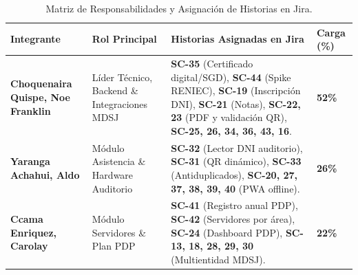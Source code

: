 \begin{table}[H]
\centering
\small
\caption{Matriz de Responsabilidades y Asignación de Historias en Jira.}
\label{tab:asignacion_responsables}
\begin{tabularx}{\textwidth}{P{4.0cm} P{3.0cm} Y P{1.8cm}}
\toprule
\textbf{Integrante} & \textbf{Rol Principal} & \textbf{Historias Asignadas en Jira} & \textbf{Carga (\%)} \\
\midrule
\textbf{Choquenaira Quispe, Noe Franklin} & Líder Técnico, Backend \& Integraciones MDSJ & 
\textbf{SC-35} (Certificado digital/SGD), \textbf{SC-44} (Spike RENIEC), \textbf{SC-19} (Inscripción DNI), \textbf{SC-21} (Notas), \textbf{SC-22, 23} (PDF y validación QR), \textbf{SC-25, 26, 34, 36, 43, 16}. & \textbf{52\%} \\
\addlinespace[0.1cm]
\textbf{Yaranga Achahui, Aldo} & Módulo Asistencia \& Hardware Auditorio & 
\textbf{SC-32} (Lector DNI auditorio), \textbf{SC-31} (QR dinámico), \textbf{SC-33} (Antiduplicados), \textbf{SC-20, 27, 37, 38, 39, 40} (PWA offline). & \textbf{26\%} \\
\addlinespace[0.1cm]
\textbf{Ccama Enriquez, Carolay} & Módulo Servidores \& Plan PDP & 
\textbf{SC-41} (Registro anual PDP), \textbf{SC-42} (Servidores por área), \textbf{SC-24} (Dashboard PDP), \textbf{SC-13, 18, 28, 29, 30} (Multientidad MDSJ). & \textbf{22\%} \\
\bottomrule
\end{tabularx}
\end{table}
